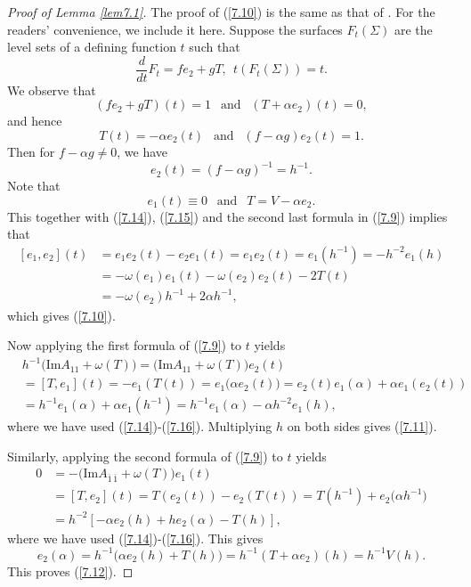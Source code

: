 \documentclass{amsart}
\theoremstyle{Corollary}
\numberwithin{equation}{section}
\begin{document}
\begin{proof}[Proof of Lemma \ref{lem7.1}]
The proof of (\ref{7.10}) is the same as that of \cite{CYZ}. 
For the readers' convenience, we include it here. 
Suppose the surfaces $F_t(\Sigma)$ are the level sets of a defining 
function $t$ such that 
$$\frac{d}{dt}F_t=fe_2+gT,~~t(F_t(\Sigma))=t.$$
We observe that 
\begin{equation*}
(fe_2+gT)(t)=1~~\mbox{ and }~~(T+\alpha e_2)(t)=0,
\end{equation*}
and hence 
\begin{equation}\label{7.14}
T(t)=-\alpha e_2(t)~~\mbox{ and }~~
(f-\alpha g)e_2(t)=1.
\end{equation}
Then for $f-\alpha g\neq 0$, we have 
\begin{equation}\label{7.15}
e_2(t)=(f-\alpha g)^{-1}=h^{-1}.
\end{equation}
Note that 
\begin{equation}\label{7.16}
e_1(t)\equiv 0~~\mbox{ and }~~T=V-\alpha e_2. 
\end{equation}
This together with 
(\ref{7.14}), (\ref{7.15}) and the second last formula in (\ref{7.9})
implies that 
\begin{equation*}
\begin{split}
[e_1,e_2](t)
&=e_1e_2(t)-e_2e_1(t)=e_1e_2(t)=e_1(h^{-1})=-h^{-2}e_1(h)\\
&=-\omega(e_1)e_1(t)-\omega(e_2)e_2(t)-2T(t)\\
&=-\omega(e_2)h^{-1}+2\alpha h^{-1},
\end{split}
\end{equation*}
which gives (\ref{7.10}). 

Now applying the first formula of (\ref{7.9}) to $t$ yields 
\begin{equation*}
\begin{split}
&h^{-1}\big(\mbox{Im}A_{11}+\omega(T)\big)=\big(\mbox{Im}A_{11}+\omega(T)\big)e_2(t)\\
&=[T,e_1](t)=-e_1(T(t))=e_1\big(\alpha e_2(t)\big)
=e_2(t)e_1(\alpha)+\alpha e_1(e_2(t))\\
&=h^{-1}e_1(\alpha)+\alpha e_1(h^{-1})
=h^{-1}e_1(\alpha)-\alpha h^{-2} e_1(h),
\end{split}
\end{equation*}
where we have used (\ref{7.14})-(\ref{7.16}). 
Multiplying $h$ on both sides gives  (\ref{7.11}). 

Similarly, applying the second formula of (\ref{7.9}) to $t$ yields
\begin{equation*}
\begin{split}
0&=-\big(\mbox{Im}A_{\overline{1}\,\overline{1}}+\omega(T)\big)e_1(t)\\
&=[T,e_2](t)=T(e_2(t))-e_2(T(t))=T(h^{-1})+e_2\big(\alpha h^{-1}\big)\\
&=h^{-2}[-\alpha e_2(h)+he_2(\alpha)-T(h)],
\end{split}
\end{equation*}
where we have used (\ref{7.14})-(\ref{7.16}). This gives 
$$e_2(\alpha)=h^{-1}\big(\alpha e_2(h)+T(h)\big)
=h^{-1}(T+\alpha e_2)(h)=h^{-1}V(h).$$
This proves (\ref{7.12}). 


\end{proof}
\end{document}
